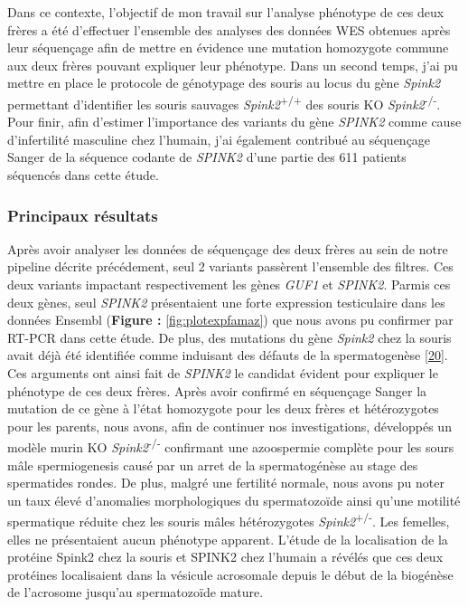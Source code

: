 \documentclass[12pt,twoside]{reedthesis}
\theoremstyle{definition}
\theoremstyle{definition}
\theoremstyle{remark}
\begin{document}
  Dans ce contexte, l'objectif de mon travail sur l'analyse phénotype de
  ces deux frères a été d'effectuer l'ensemble des analyses des données
  WES obtenues après leur séquençage afin de mettre en évidence une
  mutation homozygote commune aux deux frères pouvant expliquer leur
  phénotype. Dans un second temps, j'ai pu mettre en place le protocole de
  génotypage des souris au locus du gène \emph{Spink2} permettant
  d'identifier les souris sauvages \emph{Spink2}\textsuperscript{+/+} des
  souris KO \emph{Spink2}\textsuperscript{-/-}. Pour finir, afin d'estimer
  l'importance des variants du gène \emph{SPINK2} comme cause
  d'infertilité masculine chez l'humain, j'ai également contribué au
  séquençage Sanger de la séquence codante de \emph{SPINK2} d'une partie
  des 611 patients séquencés dans cette étude.
  
  \newpage
  
  
  
  \newpage
  
  \subsubsection{Principaux résultats}\label{principaux-resultats}
  
  Après avoir analyser les données de séquençage des deux frères au sein
  de notre pipeline décrite précédement, seul 2 variants passèrent
  l'ensemble des filtres. Ces deux variants impactant respectivement les
  gènes \emph{GUF1} et \emph{SPINK2}. Parmis ces deux gènes, seul
  \emph{SPINK2} présentaient une forte expression testiculaire dans les
  données Ensembl (\textbf{Figure : }\ref{fig:plotexpfamaz}) que nous
  avons pu confirmer par RT-PCR dans cette étude. De plus, des mutations
  du gène \emph{Spink2} chez la souris avait déjà été identifiée comme
  induisant des défauts de la spermatogenèse
  {[}\protect\hyperlink{ref-Lee2011}{20}{]}. Ces arguments ont ainsi fait
  de \emph{SPINK2} le candidat évident pour expliquer le phénotype de ces
  deux frères. Après avoir confirmé en séquençage Sanger la mutation de ce
  gène à l'état homozygote pour les deux frères et hétérozygotes pour les
  parents, nous avons, afin de continuer nos investigations, développés un
  modèle murin KO \emph{Spink2}\textsuperscript{-/-} confirmant une
  azoospermie complète pour les sours mâle spermiogenesis causé par un
  arret de la spermatogénèse au stage des spermatides rondes. De plus,
  malgré une fertilité normale, nous avons pu noter un taux élevé
  d'anomalies morphologiques du spermatozoïde ainsi qu'une motilité
  spermatique réduite chez les souris mâles hétérozygotes
  \emph{Spink2}\textsuperscript{+/-}. Les femelles, elles ne présentaient
  aucun phénotype apparent. L'étude de la localisation de la protéine
  Spink2 chez la souris et SPINK2 chez l'humain a révélés que ces deux
  protéines localisaient dans la vésicule acrosomale depuis le début de la
  biogénèse de l'acrosome jusqu'au spermatozoïde mature.
  
\end{document}
